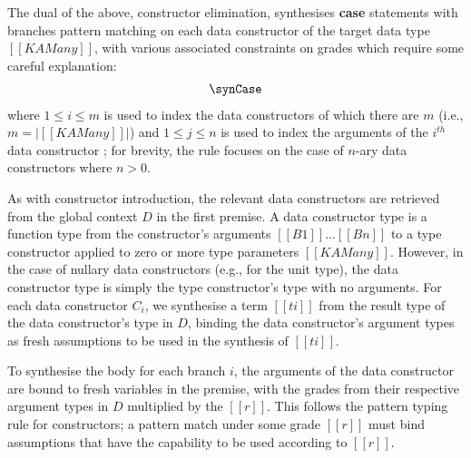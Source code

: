 The dual of the above, constructor elimination, synthesises \textbf{case} statements with branches pattern matching on each data constructor of the target data type $[[K {A Many}]]$, with various associated constraints on grades which require some careful explanation:
%
\begin{align*}
    \synCase
\end{align*}
%
where $1 \leq i \leq m$ is used to index the data constructors of which there
are $m$ (i.e., $m = |[[ K {A Many} ]]|$) and
$1 \leq j \leq n$ is used to index the arguments of the $i^{th}$ data constructor
; for brevity, the rule focuses on the case of $n$-ary data constructors where $n > 0$.

As with constructor introduction, the relevant data
constructors are retrieved from the global context $D$ in the first premise.
A data constructor type
is a function type from the constructor's arguments $[[ B1 ]] \ldots [[ Bn ]]$ to
a type constructor applied to zero or more type parameters $[[ K {A Many} ]]$.
However, in the case of nullary
data constructors (e.g., for the unit type), the data constructor type is simply the type
constructor's type with no arguments. For each data constructor $C_{i}$,
we synthesise a term $[[ ti ]]$ from the result type of the data constructor's
type in $D$, binding the data constructor's argument types as fresh assumptions
to be used in the synthesis of $[[ ti ]]$.

To synthesise the body for each branch $i$, the arguments of the
data constructor are bound to fresh variables in the premise,
with the grades from their respective argument types in $D$ multiplied by the
$[[ r ]]$. This follows the pattern typing rule for constructors; a pattern
match under some grade $[[ r ]]$ must bind assumptions that have the capability
to be used according to $[[ r ]]$.

